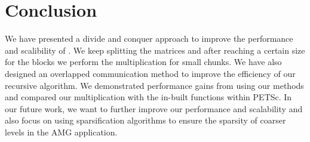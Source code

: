 \section{Conclusion}
\label{sec:conc}

We have presented a divide and conquer approach to improve the performance and scalibility of \mm. We keep splitting the matrices and after reaching a certain size for the blocks we perform the multiplication for small chunks. We have also designed an overlapped communication method to improve the efficiency of our recursive algorithm. We demonstrated performance gains from using our methods and compared our multiplication with the in-built functions within PETSc. In our future work, we want to further improve our performance and scalability and also focus on using sparsification algorithms to ensure the sparsity of coarser levels in the AMG application. 
